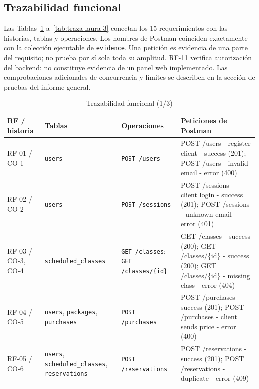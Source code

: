 \subsection{Trazabilidad funcional}
Las Tablas~\ref{tab:traza-laura-1} a~\ref{tab:traza-laura-3} conectan los 15 requerimientos con las historias, tablas y operaciones. Los nombres de Postman coinciden exactamente con la colección ejecutable de \texttt{evidence}. Una petición es evidencia de una parte del requisito; no prueba por sí sola toda su amplitud. RF-11 verifica autorización del backend: no constituye evidencia de un panel web implementado. Las comprobaciones adicionales de concurrencia y límites se describen en la sección de pruebas del informe general.
\begin{table}[!t]\caption{Trazabilidad funcional (1/3)}\label{tab:traza-laura-1}\centering\scriptsize\setlength{\tabcolsep}{4pt}
\begin{tabular}{p{}p{}p{}p{}}\toprule
RF / historia & Tablas & Operaciones & Peticiones de Postman \\ \midrule
RF-01 / CO-1 & \texttt{users} & \texttt{POST /\allowbreak{}users} & POST /\allowbreak{}users - register client - success (201); POST /\allowbreak{}users - invalid email - error (400) \\
RF-02 / CO-2 & \texttt{users} & \texttt{POST /\allowbreak{}sessions} & POST /\allowbreak{}sessions - client login - success (201); POST /\allowbreak{}sessions - unknown email - error (401) \\
RF-03 / CO-3, CO-4 & \texttt{scheduled\_\allowbreak{}classes} & \texttt{GET /\allowbreak{}classes}; \texttt{GET /\allowbreak{}classes/\allowbreak{}\{id\}} & GET /\allowbreak{}classes - success (200); GET /\allowbreak{}classes/\allowbreak{}\{id\} - success (200); GET /\allowbreak{}classes/\allowbreak{}\{id\} - missing class - error (404) \\
RF-04 / CO-5 & \texttt{users}, \texttt{packages}, \texttt{purchases} & \texttt{POST /\allowbreak{}purchases} & POST /\allowbreak{}purchases - success (201); POST /\allowbreak{}purchases - client sends price - error (400) \\
RF-05 / CO-6 & \texttt{users}, \texttt{scheduled\_\allowbreak{}classes}, \texttt{reservations} & \texttt{POST /\allowbreak{}reservations} & POST /\allowbreak{}reservations - success (201); POST /\allowbreak{}reservations - duplicate - error (409) \\
\bottomrule\end{tabular}\end{table}
